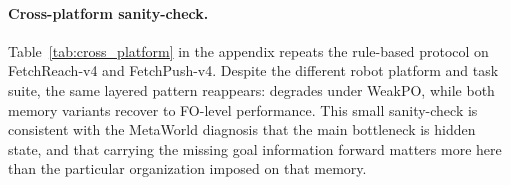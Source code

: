 \paragraph{Cross-platform sanity-check.}
Table~\ref{tab:cross_platform} in the appendix repeats the rule-based protocol on FetchReach-v4 and FetchPush-v4. Despite the different robot platform and task suite, the same layered pattern reappears:  degrades under WeakPO, while both memory variants recover to FO-level performance. This small sanity-check is consistent with the MetaWorld diagnosis that the main bottleneck is hidden state, and that carrying the missing goal information forward matters more here than the particular organization imposed on that memory.

\FloatBarrier

